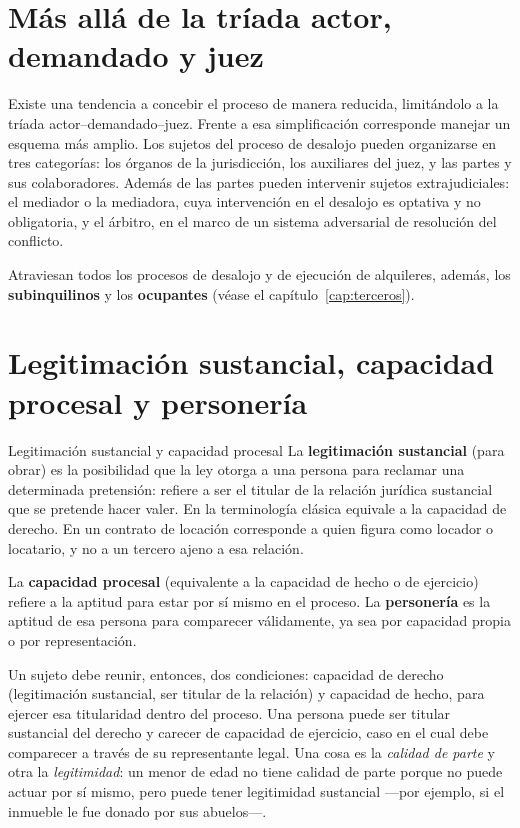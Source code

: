 \documentclass[12pt,oneside]{book}
\begin{document}
\section{Más allá de la tríada actor, demandado y juez}\label{sec:triada}

Existe una tendencia a concebir el proceso de manera reducida, limitándolo a la tríada actor--demandado--juez. Frente a esa simplificación corresponde manejar un esquema más amplio. Los sujetos del proceso de desalojo pueden organizarse en tres categorías: los órganos de la jurisdicción, los auxiliares del juez, y las partes y sus colaboradores. Además de las partes pueden intervenir sujetos extrajudiciales: el mediador o la mediadora, cuya intervención en el desalojo es optativa y no obligatoria, y el árbitro, en el marco de un sistema adversarial de resolución del conflicto.

Atraviesan todos los procesos de desalojo y de ejecución de alquileres, además, los \textbf{subinquilinos} y los \textbf{ocupantes} (véase el capítulo~\ref{cap:terceros}).

\section{Legitimación sustancial, capacidad procesal y personería}\label{sec:legitimacion}

\begin{definition}{Legitimación sustancial y capacidad procesal}
La \textbf{legitimación sustancial} (para obrar) es la posibilidad que la ley otorga a una persona para reclamar una determinada pretensión: refiere a ser el titular de la relación jurídica sustancial que se pretende hacer valer. En la terminología clásica equivale a la capacidad de derecho. En un contrato de locación corresponde a quien figura como locador o locatario, y no a un tercero ajeno a esa relación.

La \textbf{capacidad procesal} (equivalente a la capacidad de hecho o de ejercicio) refiere a la aptitud para estar por sí mismo en el proceso. La \textbf{personería} es la aptitud de esa persona para comparecer válidamente, ya sea por capacidad propia o por representación.
\end{definition}

Un sujeto debe reunir, entonces, dos condiciones: capacidad de derecho (legitimación sustancial, ser titular de la relación) y capacidad de hecho, para ejercer esa titularidad dentro del proceso. Una persona puede ser titular sustancial del derecho y carecer de capacidad de ejercicio, caso en el cual debe comparecer a través de su representante legal. Una cosa es la \emph{calidad de parte} y otra la \emph{legitimidad}: un menor de edad no tiene calidad de parte porque no puede actuar por sí mismo, pero puede tener legitimidad sustancial ---por ejemplo, si el inmueble le fue donado por sus abuelos---.
\end{document}
